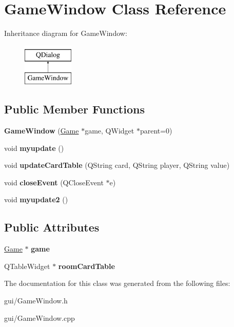 \hypertarget{classGameWindow}{}\section{Game\+Window Class Reference}
\label{classGameWindow}
Inheritance diagram for Game\+Window\+:\begin{figure}[H]
\begin{center}
\leavevmode
\includegraphics[height=2.000000cm]{classGameWindow}
\end{center}
\end{figure}
\subsection*{Public Member Functions}
\begin{DoxyCompactItemize}
\item 
\mbox{\label{classGameWindow_af2794433e83e7821746b6c8821772ebc}} 
{\bfseries Game\+Window} (\hyperlink{classGame}{Game} $\ast$game, Q\+Widget $\ast$parent=0)
\item 
\mbox{\label{classGameWindow_a4cb00162e90812c2331d1a28ba0b0ebc}} 
void {\bfseries myupdate} ()
\item 
\mbox{\label{classGameWindow_a3506333aeaf3d6e79ec07e3cc20ff21a}} 
void {\bfseries update\+Card\+Table} (Q\+String card, Q\+String player, Q\+String value)
\item 
\mbox{\label{classGameWindow_ac978d7204e47e584a385a3c60d83dd8a}} 
void {\bfseries close\+Event} (Q\+Close\+Event $\ast$e)
\item 
\mbox{\label{classGameWindow_a8dc0b395836425a0f20bde22293b4075}} 
void {\bfseries myupdate2} ()
\end{DoxyCompactItemize}
\subsection*{Public Attributes}
\begin{DoxyCompactItemize}
\item 
\mbox{\label{classGameWindow_a83490ef95c69897b92002b3016de98c9}} 
\hyperlink{classGame}{Game} $\ast$ {\bfseries game}
\item 
\mbox{\label{classGameWindow_a4e7d69a2995175c4a7ebaa2cf082ad1b}} 
Q\+Table\+Widget $\ast$ {\bfseries room\+Card\+Table}
\end{DoxyCompactItemize}


The documentation for this class was generated from the following files\+:\begin{DoxyCompactItemize}
\item 
gui/Game\+Window.\+h\item 
gui/Game\+Window.\+cpp\end{DoxyCompactItemize}
